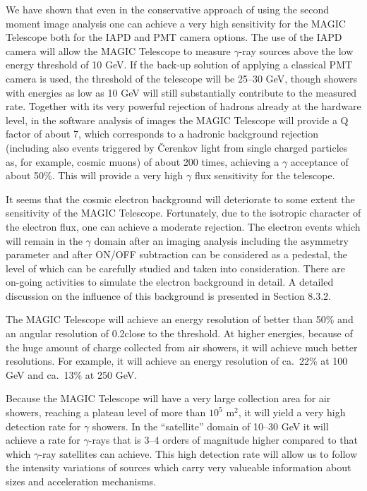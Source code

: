 We have shown that even in the conservative approach of using the
second moment image analysis one can achieve a very high sensitivity
for the MAGIC Telescope both for the IAPD and PMT camera options.  The
use of the IAPD camera will allow the MAGIC Telescope to measure
$\gamma$-ray sources above the low energy threshold of 10 GeV. If the
back-up solution of applying a classical PMT camera is used, the
threshold of the telescope will be 25--30 GeV, though showers with
energies as low as 10 GeV will still substantially contribute to the
measured rate.  Together with its very powerful rejection of hadrons
already at the hardware level, in the software analysis of images the
MAGIC Telescope will provide a Q factor of about 7, which corresponds
to a hadronic background rejection (including also events triggered by
\v{C}erenkov light from single charged particles as, for example,
cosmic muons) of about 200 times, achieving a $\gamma$ acceptance of
about 50\%. This will provide a very high $\gamma$ flux sensitivity
for the telescope.

It seems that the cosmic electron background will deteriorate to some
extent the sensitivity of the MAGIC Telescope. Fortunately, due to the isotropic
character of the electron flux, one can achieve a moderate rejection.
The electron events which will remain in the $\gamma$ domain after an imaging analysis
including the asymmetry parameter and after ON/OFF subtraction
can be considered as a pedestal, the level of which can be carefully studied
and taken into consideration.  There are on-going activities to simulate the
electron background in detail. A detailed discussion on the influence
of this background is presented in Section 8.3.2.

The MAGIC Telescope
will achieve an energy resolution of
better than 50\%  and an angular
resolution of 0.2\tdeg close to the threshold.  At higher energies,
because of the huge amount of charge collected from air showers, it will
achieve much better resolutions. For example, it will achieve an
energy resolution of ca.~22\% at 100 GeV and ca.~13\%
at 250 GeV.
%

Because the MAGIC Telescope
will have a very large collection area for air showers, reaching a plateau
level of more than $10^5$ m$^2$, it 
will yield a very high detection rate for
$\gamma$ showers. In the ``satellite'' domain of 10--30 GeV it will
achieve a rate for $\gamma$-rays that is  3--4 orders of magnitude higher
compared to that which $\gamma$-ray satellites can achieve.
This high detection rate 
will allow us to follow the intensity variations of sources which carry
very valueable information about sizes and acceleration mechanisms.

